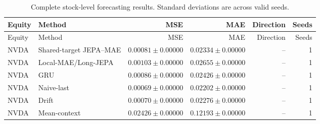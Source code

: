 \begin{longtable}{llrrrr}
\caption{Complete stock-level forecasting results. Standard deviations are across valid seeds.}\label{tab:appendix_stock_metrics}\\
\toprule
Equity & Method & MSE & MAE & Direction & Seeds \\
\midrule
\endfirsthead
\toprule
Equity & Method & MSE & MAE & Direction & Seeds \\
\midrule
\endhead
NVDA & Shared-target JEPA--MAE & $0.00081 \pm 0.00000$ & $0.02334 \pm 0.00000$ & -- & 1 \\
NVDA & Local-MAE/Long-JEPA & $0.00103 \pm 0.00000$ & $0.02655 \pm 0.00000$ & -- & 1 \\
NVDA & GRU & $0.00086 \pm 0.00000$ & $0.02426 \pm 0.00000$ & -- & 1 \\
NVDA & Naive-last & $0.00069 \pm 0.00000$ & $0.02202 \pm 0.00000$ & -- & 1 \\
NVDA & Drift & $0.00070 \pm 0.00000$ & $0.02276 \pm 0.00000$ & -- & 1 \\
NVDA & Mean-context & $0.02426 \pm 0.00000$ & $0.12193 \pm 0.00000$ & -- & 1 \\
\bottomrule
\end{longtable}
